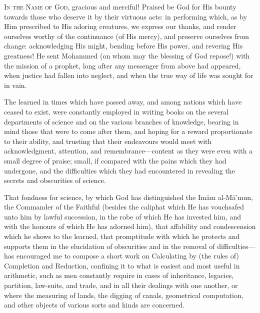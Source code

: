 \documentclass[11pt,a4paper]{book}
\begin{document}
\begin{minipage}[t]{0.48\textwidth}
\raggedright

\lettrine[lines=2, lhang=0.33, nindent=0em, findent=3pt, loversize=0.14]{
\textcolor{dropgold}{I}}{n the Name of God,} gracious and merciful! Praised be God for His bounty towards those who deserve it by their virtuous acts: in performing which, as by Him prescribed to His adoring creatures, we express our thanks, and render ourselves worthy of the continuance (of His mercy), and preserve ourselves from change: acknowledging His might, bending before His power, and revering His greatness! He sent Mohammed (on whom may the blessing of God repose!) with the mission of a prophet, long after any messenger from above had appeared, when justice had fallen into neglect, and when the true way of life was sought for in vain.

\vspace{0.3cm}

The learned in times which have passed away, and among nations which have ceased to exist, were constantly employed in writing books on the several departments of science and on the various branches of knowledge, bearing in mind those that were to come after them, and hoping for a reward proportionate to their ability, and trusting that their endeavours would meet with acknowledgment, attention, and remembrance---content as they were even with a small degree of praise; small, if compared with the pains which they had undergone, and the difficulties which they had encountered in revealing the secrets and obscurities of science.

\vspace{0.3cm}

That fondness for science, by which God has distinguished the Im\=am al-M\=a'mun, the Commander of the Faithful (besides the caliphat which He has vouchsafed unto him by lawful succession, in the robe of which He has invested him, and with the honours of which He has adorned him), that affability and condescension which he shows to the learned, that promptitude with which he protects and supports them in the elucidation of obscurities and in the removal of difficulties---has encouraged me to compose a short work on Calculating by (the rules of) Completion and Reduction, confining it to what is easiest and most useful in arithmetic, such as men constantly require in cases of inheritance, legacies, partition, law-suits, and trade, and in all their dealings with one another, or where the measuring of lands, the digging of canals, geometrical computation, and other objects of various sorts and kinds are concerned.

\end{minipage}
\vspace{0.3cm}
\end{document}

